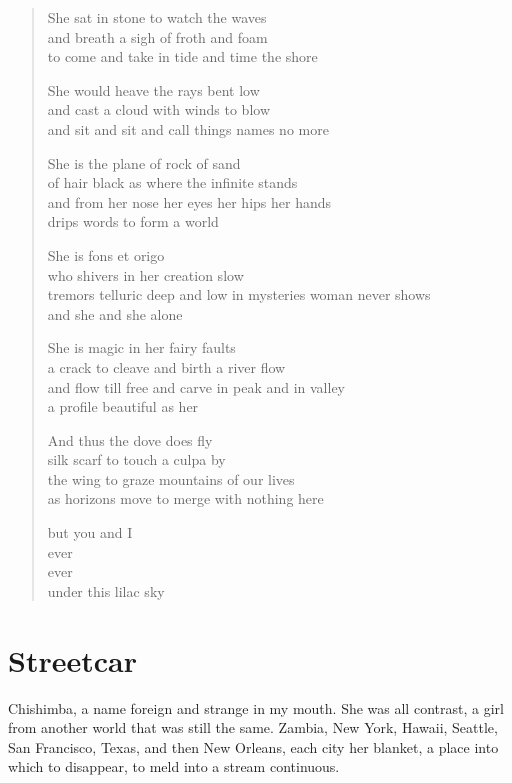 \documentclass[ebook, 10pt, openright, onecolumn]{memoir}
\newenvironment{poetry}
{
  \begin{quote}
    \begin{itshape}
      \small
    }
    {
    \end{itshape}
  \end{quote}
}
\begin{document}
\begin{poetry}
  She sat in stone to watch the waves\\
  and breath a sigh of froth and foam\\
  to come and take in tide and time the shore

  She would heave the rays bent low\\
  and cast a cloud with winds to blow\\
  and sit and sit and call things names no more

  She is the plane of rock of sand\\
  of hair black as where the infinite stands\\
  and from her nose her eyes her hips her hands\\
  drips words to form a world

  She is fons et origo\\
  who shivers in her creation slow\\
  tremors telluric deep and low in mysteries woman never shows\\
  and she and she alone

  She is magic in her fairy faults\\
  a crack to cleave and birth a river flow\\
  and flow till free and carve in peak and in valley\\
  a profile beautiful as her

  And thus the dove does fly\\
  silk scarf to touch a culpa by\\
  the wing to graze mountains of our lives\\
  as horizons move to merge with nothing here

  but you and I\\
  ever\\
  ever\\
  under this lilac sky
\end{poetry}

\chapter{Streetcar}
\label{cha:streetcar}

Chishimba, a name foreign and strange in my mouth.  She was all contrast, a girl
from another world that was still the same.  Zambia, New York, Hawaii, Seattle,
San Francisco, Texas, and then New Orleans, each city her blanket, a place
into which to disappear, to meld into a stream continuous.
\end{document}
